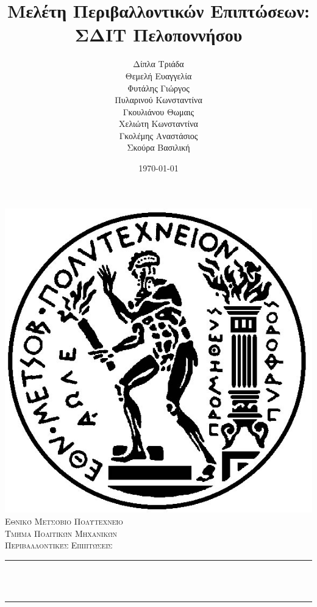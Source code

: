 \documentclass[12pt]{article}
\title{Μελέτη Περιβαλλοντικών Επιπτώσεων: ΣΔΙΤ Πελοποννήσου}
\author{ Δίπλα Τριάδα\\
	Θεμελή Ευαγγελία\\
	Φυτάλης Γιώργος \\
	Πυλαρινού Κωνσταντίνα\\
	Γκουλιάνου Θωμαις \\
	Χελιώτη Κωνσταντίνα \\
	Γκολέμης Αναστάσιος \\
	Σκούρα Βασιλική}                               %
\date{\today}                                           %
\makeatletter
\let\thetitle\@title
\let\theauthor\@author
\let\thedate\@date
\makeatother
\begin{document}
	
	\begin{titlepage}
		\centering
		\vspace*{0.5 cm}
		\includegraphics[scale = 0.10]{logo.jpg}\\[1.0 cm]   %
		\textsc{\LARGE Εθνικό Μετσόβιο Πολυτεχνείο}\\[2.0 cm]   %
		\textsc{\Large Τμήμα Πολιτικών Μηχανικών}\\[0.5 cm]               %
		\textsc{\large Περιβαλλοντικές Επιπτώσεις}\\[0.5 cm]               %
		\rule{\linewidth}{0.2 mm} \\[0.4 cm]
		{ \huge \bfseries \thetitle}\\
		\rule{\linewidth}{0.2 mm} \\[1.5 cm]
		
		\begin{minipage}{0.4\textwidth}
			\begin{center} \large
				\theauthor
			\end{center}
		\end{minipage}~
		\begin{minipage}{0.4\textwidth}
		\end{minipage}\\[2 cm]
		
		{\large \thedate}\\[2 cm]
		
		\vfill
		
	\end{titlepage}
\end{document}
